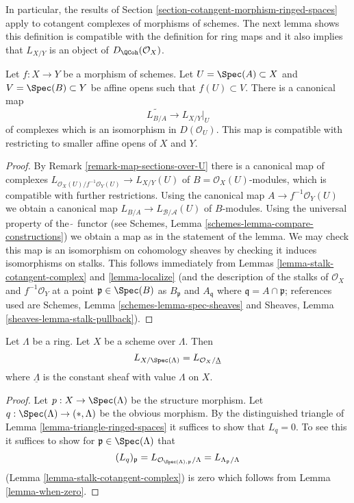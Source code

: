 \noindent
In particular, the results of
Section \ref{section-cotangent-morphism-ringed-spaces} apply
to cotangent complexes of morphisms of schemes.
The next lemma shows this definition is compatible with the definition
for ring maps and it also implies that $L_{X/Y}$ is an
object of $D_\QCoh(\mathcal{O}_X)$.

\begin{lemma}
\label{lemma-morphism-affine-schemes}
Let $f : X \to Y$ be a morphism of schemes. Let $U = \Spec(A) \subset X$
and $V = \Spec(B) \subset Y$ be affine opens such that $f(U) \subset V$.
There is a canonical map
$$
\widetilde{L_{B/A}} \longrightarrow L_{X/Y}|_U
$$
of complexes which is an isomorphism in $D(\mathcal{O}_U)$.
This map is compatible with restricting to smaller affine opens
of $X$ and $Y$.
\end{lemma}

\begin{proof}
By Remark \ref{remark-map-sections-over-U}
there is a canonical map of complexes
$L_{\mathcal{O}_X(U)/f^{-1}\mathcal{O}_Y(U)} \to L_{X/Y}(U)$
of $B = \mathcal{O}_X(U)$-modules, which is compatible
with further restrictions. Using the canonical map
$A \to f^{-1}\mathcal{O}_Y(U)$ we obtain a canonical map
$L_{B/A} \to L_{\mathcal{B}/\mathcal{A}}(U)$
of $B$-modules. Using the universal property of the $\widetilde{\ }$
functor (see Schemes, Lemma \ref{schemes-lemma-compare-constructions})
we obtain a map as in the statement of the lemma.
We may check this map is an isomorphism on cohomology sheaves
by checking it induces isomorphisms on stalks.
This follows immediately from
Lemmas \ref{lemma-stalk-cotangent-complex} and \ref{lemma-localize}
(and the description of the stalks of
$\mathcal{O}_X$ and $f^{-1}\mathcal{O}_Y$
at a point $\mathfrak p \in \Spec(B)$ as $B_\mathfrak p$ and
$A_\mathfrak q$ where $\mathfrak q = A \cap \mathfrak p$; references
used are Schemes, Lemma \ref{schemes-lemma-spec-sheaves}
and
Sheaves, Lemma \ref{sheaves-lemma-stalk-pullback}).
\end{proof}

\begin{lemma}
\label{lemma-scheme-over-ring}
Let $\Lambda$ be a ring. Let $X$ be a scheme over $\Lambda$.
Then
$$
L_{X/\Spec(\Lambda)} = L_{\mathcal{O}_X/\underline{\Lambda}}
$$
where $\underline{\Lambda}$ is the constant sheaf with value
$\Lambda$ on $X$.
\end{lemma}

\begin{proof}
Let $p : X \to \Spec(\Lambda)$ be the structure morphism.
Let $q : \Spec(\Lambda) \to (*, \Lambda)$ be the obvious morphism.
By the distinguished triangle of Lemma \ref{lemma-triangle-ringed-spaces}
it suffices to show that $L_q = 0$. To see this it suffices to
show for $\mathfrak p \in \Spec(\Lambda)$ that
$$
(L_q)_\mathfrak p =
L_{\mathcal{O}_{\Spec(\Lambda), \mathfrak p}/\Lambda} =
L_{\Lambda_\mathfrak p/\Lambda}
$$
(Lemma \ref{lemma-stalk-cotangent-complex})
is zero which follows from Lemma \ref{lemma-when-zero}.
\end{proof}







